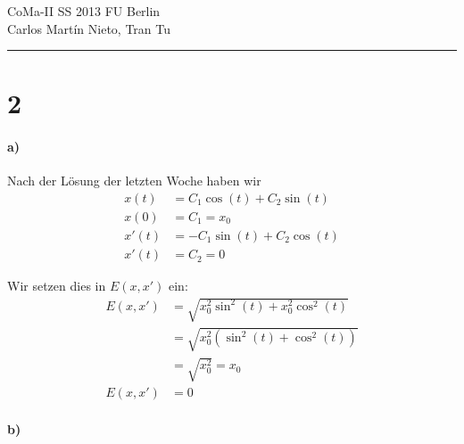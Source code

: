 \documentclass[ngerman,a4paper]{scrartcl}
\begin{document}
{\sffamily
  \hfill
  CoMa-II SS 2013\hfill
  FU Berlin\\[8pt]
  \hfill Carlos Martín Nieto, Tran Tu\hrule \bigskip
}

\section*{2}

\paragraph{a)}


Nach der Lösung der letzten Woche haben wir
\begin{align*}
  x(t) &= C_1 \cos(t) + C_2 \sin(t)\\
  x(0) &= \boxed{C_1 = x_0}\\
  x'(t) &= -C_1 \sin(t) + C_2 \cos(t)\\
  x'(t) &= \boxed{C_2 = 0}
\end{align*}

Wir setzen dies in $E(x,x')$ ein:
\begin{align*}
  E(x,x') &= \sqrt{x_0^2 \sin^2(t) + x_0^2 \cos^2(t)}\\
  &= \sqrt{x_0^2 (\sin^2(t) + \cos^2(t))}\\
  &= \sqrt{x_0^2} = x_0\\
  E(x,x') &= 0
\end{align*}

\paragraph{b)}
\end{document}
